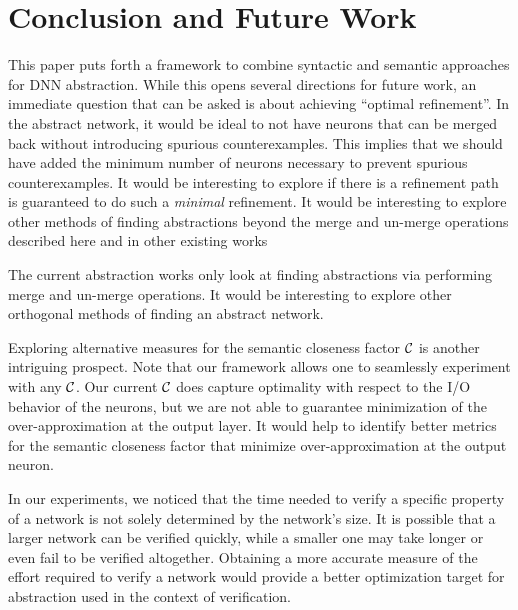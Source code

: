 \section{Conclusion and Future Work}

This paper puts forth a framework to combine syntactic and semantic approaches
for DNN abstraction. While this opens several directions for future work, an
immediate question that can be asked is about achieving ``optimal refinement''.
In the abstract network, it would be ideal to not have neurons that can be
merged back without introducing spurious counterexamples. This implies that we
should have added the minimum number of neurons necessary to prevent spurious
counterexamples. 
It would  be interesting to explore if there is a refinement path 
is guaranteed to do such a \emph{minimal} refinement. 
It would be interesting to explore other methods of finding abstractions beyond 
the merge and un-merge operations described here and in other existing works
\cite{cegar-nn, cleverest-nn} 

The current abstraction works \cite{cegar-nn, deep-abstract} only look at
finding abstractions via performing merge and
un-merge operations. It would be interesting to explore other orthogonal methods
of finding an abstract network.

Exploring alternative measures for the semantic closeness factor $\mathcal{C}$ is
another intriguing prospect. Note that our framework allows one to seamlessly
experiment with any $\mathcal{C}$. Our current $\mathcal{C}$ does capture optimality with
respect to the I/O behavior of the neurons, but we are not able to guarantee
minimization of the over-approximation at the output layer. It would help to
identify better metrics for the semantic closeness factor that minimize
over-approximation at the output neuron.   

In our experiments, we noticed that the time needed to verify a specific
property of a network is not solely determined by the network's size. It is
possible that a larger network can be verified quickly, while a smaller one may
take longer or even fail to be verified altogether. Obtaining a more accurate
measure of the effort required to verify a network would provide a better
optimization target for abstraction used in the context of verification.



